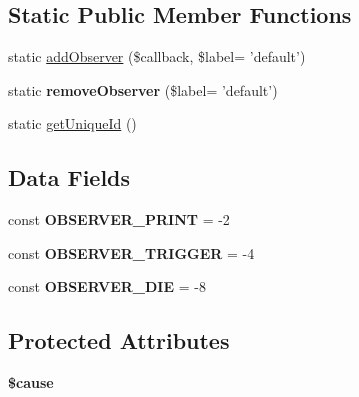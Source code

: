 \subsection*{Static Public Member Functions}
\begin{DoxyCompactItemize}
\item 
static \hyperlink{class_p_e_a_r___exception_af85daa39ef3df0244a5f17a7fb2d044f}{addObserver} (\$callback, \$label= 'default')
\item 
\hypertarget{class_p_e_a_r___exception_aaf4649e65c5836be3dfbd15ebaca11ca}{
static {\bfseries removeObserver} (\$label= 'default')}
\label{class_p_e_a_r___exception_aaf4649e65c5836be3dfbd15ebaca11ca}

\item 
static \hyperlink{class_p_e_a_r___exception_a10abaabb93eed759870fd2033713d3a1}{getUniqueId} ()
\end{DoxyCompactItemize}
\subsection*{Data Fields}
\begin{DoxyCompactItemize}
\item 
\hypertarget{class_p_e_a_r___exception_a2a666694cb6c6eecf591b9b9ceb477bc}{
const {\bfseries OBSERVER\_\-PRINT} = -\/2}
\label{class_p_e_a_r___exception_a2a666694cb6c6eecf591b9b9ceb477bc}

\item 
\hypertarget{class_p_e_a_r___exception_a3cd3e7b652b2e792e1b705c623c11e41}{
const {\bfseries OBSERVER\_\-TRIGGER} = -\/4}
\label{class_p_e_a_r___exception_a3cd3e7b652b2e792e1b705c623c11e41}

\item 
\hypertarget{class_p_e_a_r___exception_a9d1e69c13046a559a6f4ade067c8c3eb}{
const {\bfseries OBSERVER\_\-DIE} = -\/8}
\label{class_p_e_a_r___exception_a9d1e69c13046a559a6f4ade067c8c3eb}

\end{DoxyCompactItemize}
\subsection*{Protected Attributes}
\begin{DoxyCompactItemize}
\item 
\hypertarget{class_p_e_a_r___exception_aefbc31986e4c5aa115e67769f29e7918}{
{\bfseries \$cause}}
\label{class_p_e_a_r___exception_aefbc31986e4c5aa115e67769f29e7918}

\end{DoxyCompactItemize}


